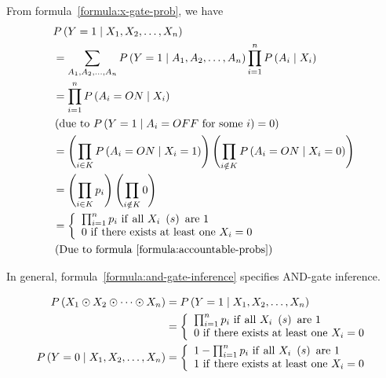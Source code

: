 \documentclass{article}
\numberwithin{equation}{section}
\numberwithin{figure}{section}
\numberwithin{table}{section}
\begin{document}
From formula~\ref{formula:x-gate-prob}, we have
\begin{align*}
&P\left(Y=1\mathrel{\left|\vphantom{Y=1 X_1,X_2,\dots ,X_n}\right.\kern-\nulldelimiterspace}X_1,X_2,\dots ,X_n\right)\\
&=\sum_{A_1,A_2,\dots ,A_n}{P\left(Y=1\mathrel{\left|\vphantom{Y=1 A_1,A_2,\dots ,A_n}\right.\kern-\nulldelimiterspace}A_1,A_2,\dots ,A_n\right)\prod^n_{i=1}{P\left(A_i\mathrel{\left|\vphantom{A_i X_i}\right.\kern-\nulldelimiterspace}X_i\right)}}\\ 
&=\prod^n_{i=1}{P\left(A_i=ON\mathrel{\left|\vphantom{A_i=ON X_i}\right.\kern-\nulldelimiterspace}X_i\right)}\\ 
&\left(\mathrm{due\ to\ }P\left(Y=1\mathrel{\left|\vphantom{Y=1 A_i=OFF\ \mathrm{for\ some}\ i}\right.\kern-\nulldelimiterspace}A_i=OFF\ \mathrm{for\ some}\ i\right)=0\right)\\
&=\left(\prod_{i\in K}{P\left(A_i=ON\mathrel{\left|\vphantom{A_i=ON X_i=1}\right.\kern-\nulldelimiterspace}X_i=1\right)}\right)\left(\prod_{i\notin K}{P\left(A_i=ON\mathrel{\left|\vphantom{A_i=ON X_i=0}\right.\kern-\nulldelimiterspace}X_i=0\right)}\right)\\
&=\left(\prod_{i\in K}{p_i}\right)\left(\prod_{i\notin K}{0}\right)\\
&=\left\{ \begin{array}{l}
\prod^n_{i=1}{p_i}\ \mathrm{if\ all}\ X_i\ \left(s\right)\ \mathrm{are}\ 1 \\ 
0\ \mathrm{if\ there\ exists\ at\ least\ one\ }X_i=0 \end{array}
\right.\\
&\left(\mathrm{Due}\ \mathrm{to}\ \mathrm{formula}\ \mathrm{\ref{formula:accountable-probs}}\right)
\end{align*}

In general, formula~\ref{formula:and-gate-inference} specifies AND-gate inference.

\begin{equation}
\begin{split}
P\left(X_1\odot X_2\odot \dots \odot X_n\right)&=P\left(Y=1\mathrel{\left|\vphantom{Y=1 X_1,X_2,\dots ,X_n}\right.\kern-\nulldelimiterspace}X_1,X_2,\dots ,X_n\right)\\
&=\left\{ \begin{array}{l}
\prod^n_{i=1}{p_i}\ \mathrm{if\ all}\ X_i\ \left(s\right)\ \mathrm{are}\ 1 \\ 
0\ \mathrm{if\ there\ exists\ at\ least\ one\ }X_i=0 \end{array}
\right.\\
P\left(Y=0\mathrel{\left|\vphantom{Y=0 X_1,X_2,\dots ,X_n}\right.\kern-\nulldelimiterspace}X_1,X_2,\dots ,X_n\right)&=\left\{ \begin{array}{l}
1-\prod^n_{i=1}{p_i}\ \mathrm{if\ all}\ X_i\ \left(s\right)\ \mathrm{are}\ 1 \\ 
1\ \mathrm{if\ there\ exists\ at\ least\ one\ }X_i=0 \end{array}
\right.
\end{split}
\label{formula:and-gate-inference}
\end{equation}
\end{document}
